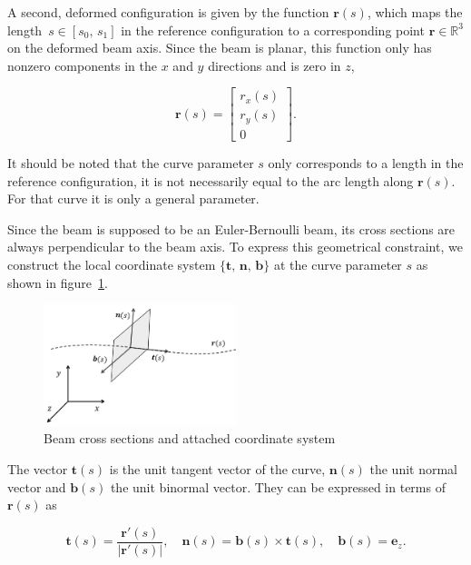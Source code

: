 A second, deformed configuration is given by the function $\boldsymbol{r}(s)$, which maps the length~$s \in [s_{0},\,s_{1}]$ in the reference configuration to a corresponding point $\boldsymbol{r} \in \mathbb{R}^3$ on the deformed beam axis.
Since the beam is planar, this function only has nonzero components in the $x$ and $y$ directions and is zero in $z$,

\begin{equation}
\boldsymbol{r}(s) = \begin{bmatrix}
r_x(s) \\
r_y(s) \\
0
\end{bmatrix}.\label{eq:beam-axis-3d}
\end{equation}

It should be noted that the curve parameter $s$ only corresponds to a length in the reference configuration, it is not necessarily equal to the arc length along $\boldsymbol{r}(s)$.
For that curve it is only a general parameter.

Since the beam is supposed to be an Euler-Bernoulli beam, its cross sections are always perpendicular to the beam axis.
To express this geometrical constraint, we construct the local coordinate system $\{\boldsymbol{t},\,\boldsymbol{n},\,\boldsymbol{b}\}$ at the curve parameter $s$ as shown in figure~\ref{fig:beam-kinematics-crosssection}.

\begin{figure}[h]
\centering
\includegraphics[width=0.5\textwidth]{figures/elements/beam-kinematics-crosssection}
\caption{Beam cross sections and attached coordinate system}
\label{fig:beam-kinematics-crosssection}
\end{figure}

The vector $\boldsymbol{t}(s)$ is the unit tangent vector of the curve, $\boldsymbol{n}(s)$ the unit normal vector and $\boldsymbol{b}(s)$ the unit binormal vector.
They can be expressed in terms of $\boldsymbol{r}(s)$ as

\begin{equation}
\boldsymbol{t}(s) = \frac{\boldsymbol{r}'(s)}{|\boldsymbol{r}'(s)|}, \quad \boldsymbol{n}(s) = \boldsymbol{b}(s) \times \boldsymbol{t}(s), \quad \boldsymbol{b}(s) = \boldsymbol{e}_{z}.
\end{equation}

